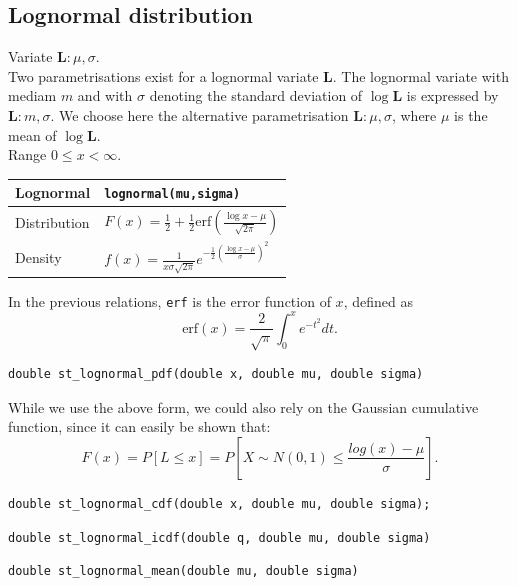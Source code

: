 \subsection{Lognormal distribution}

Variate $\boldsymbol{L}: \mu, \sigma$.\\
Two parametrisations exist for a lognormal variate $\boldsymbol{L}$.
The lognormal variate with mediam $m$ and with $\sigma$ denoting the
standard deviation of $\log \boldsymbol{L}$ is expressed by
$\boldsymbol{L}: m, \sigma$.
We choose here the alternative parametrisation $\boldsymbol{L}: \mu,
\sigma$, where $\mu$ is the mean of $\log \boldsymbol{L}$.\\
Range $0 \leq x < \infty$.

\mbox{}

\noindent
\begin{tabularx}{\textwidth}{lX}
Lognormal & \verb|lognormal(mu,sigma)|\\
\hline
Distribution &
$F(x) = \frac{1}{2}+\frac{1}{2}\text{erf}\left( \frac{\log x -
    \mu}{\sqrt{2\pi}}\right)$
\\
Density &
$f(x) = \frac{1}{x\sigma\sqrt{2\pi}}e^{-\frac{1}{2}\left(\frac{\log x -
      \mu}{\sigma}\right)^2}$ \\
\hline
\end{tabularx}

In the previous relations, \verb|erf| is the error
function of $x$, defined as
\[
\text{erf}(x) = \frac{2}{\sqrt{\pi}} \int_{0}^{x} e^{-t^2} dt.
\]

\begin{verbatim}
double st_lognormal_pdf(double x, double mu, double sigma)
\end{verbatim}
While we use the above form, we could also rely on the Gaussian
cumulative function, since it can easily be shown that:
\[
F(x) = P[L \leq x] = P\left[ X \sim N(0,1) \leq \frac{log(x)-\mu}{\sigma} \right].
\]

\begin{verbatim}
double st_lognormal_cdf(double x, double mu, double sigma);
\end{verbatim}

\begin{verbatim}
double st_lognormal_icdf(double q, double mu, double sigma)
\end{verbatim}

\begin{verbatim}
double st_lognormal_mean(double mu, double sigma)
\end{verbatim}


